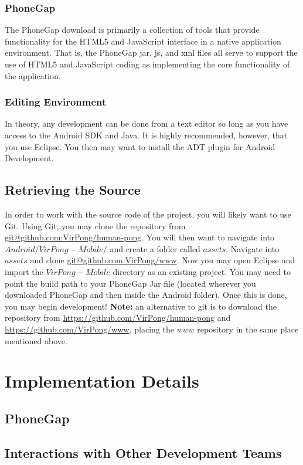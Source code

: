 \documentclass[12pt]{article}
\begin{document}
\subsubsection{PhoneGap}
The PhoneGap download is primarily a collection of tools that provide functionality for the HTML5 and JavaScript interface in a native application environment.  That is, the PhoneGap jar, js, and xml files all serve to support the use of HTML5 and JavaScript coding as implementing the core functionality of the application.   

\subsubsection{Editing Environment}
In theory, any development can be done from a text editor so long as you have access to the Android SDK and Java.  It is highly recommended, however, that you use Eclipse\cite{Eclipse-Helios}.  You then may want to install the ADT plugin for Android Development\cite{Eclipse-ADT}.

\subsection{Retrieving the Source}
In order to work with the source code of the project, you will likely want to use Git\cite{Github}.  Using Git, you may clone the repository from \url{git@github.com:VirPong/human-pong}.  You will then want to navigate into $Android/VirPong-Mobile/$ and create a folder called $assets$.  Navigate into $assets$ and clone \url{git@github.com:VirPong/www}.  Now you may open Eclipse and import the $VirPong-Mobile$ directory as an existing project.  You may need to point the build path to your PhoneGap Jar file (located wherever you downloaded PhoneGap and then inside the Android folder).  Once this is done, you may begin development!  \textbf{Note:} an alternative to git is to download the repository from \url{https://github.com/VirPong/human-pong} and \url{https://github.com/VirPong/www}, placing the $www$ repository in the same place mentioned above.

\section{Implementation Details}
\subsection{PhoneGap}

\subsection{Interactions with Other Development Teams}
\end{document}

